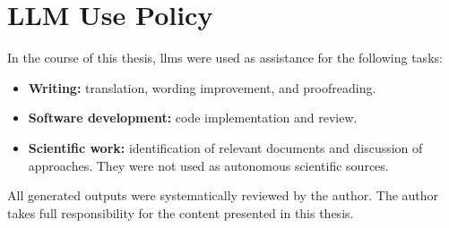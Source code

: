 \chapter*{LLM Use Policy}


\label{chap:llm_use_policy}


\glsresetall

In the course of this thesis, \glspl{llm} were used as assistance for the following tasks:
\begin{itemize}
\item \textbf{Writing:} translation, wording improvement, and proofreading.
\item \textbf{Software development:} code implementation and review.
\item \textbf{Scientific work:} identification of relevant documents and discussion of approaches. They were not used as autonomous scientific sources.
\end{itemize}

All generated outputs were systematically reviewed by the author.
The author takes full responsibility for the content presented in this thesis.
